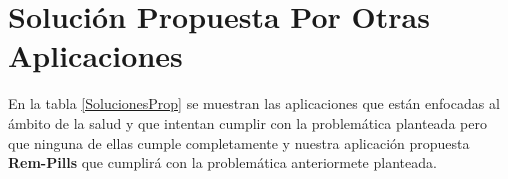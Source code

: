 
\section{Solución Propuesta Por Otras Aplicaciones}

En la tabla \ref{SolucionesProp} se muestran las aplicaciones que están enfocadas al ámbito de la salud y que intentan cumplir con la problemática planteada pero que ninguna de ellas cumple completamente y nuestra aplicación propuesta \textbf{Rem-Pills} que cumplirá con la problemática anteriormete planteada.

